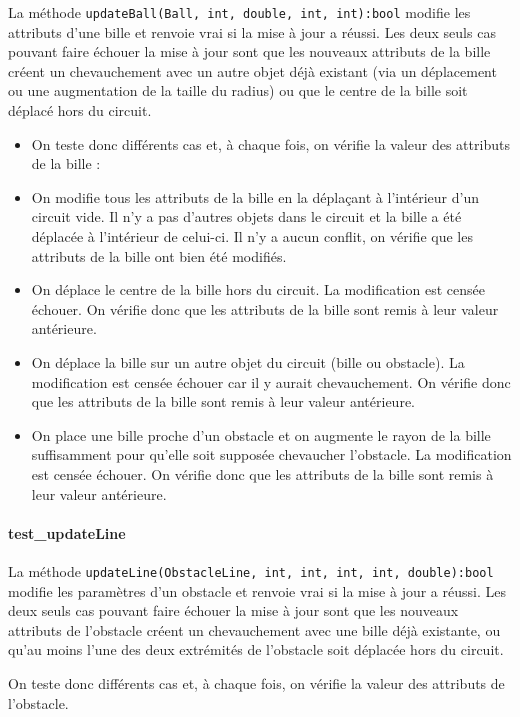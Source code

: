 \documentclass{report}
\begin{document}
La méthode \texttt{updateBall(Ball, int, double, int, int):bool} modifie les attributs d’une bille et renvoie vrai si la mise à jour a réussi.
Les deux seuls cas pouvant faire échouer la mise à jour sont que les nouveaux attributs de la bille créent un chevauchement avec un autre objet déjà existant (via un déplacement ou une augmentation de la taille du radius) ou que le centre de la bille soit déplacé hors du circuit.

\begin{itemize}
\item On teste donc différents cas et, à chaque fois, on vérifie la valeur des attributs de la bille :
\item On modifie tous les attributs de la bille en la déplaçant à l’intérieur d’un circuit vide. Il n’y a pas d’autres objets dans le circuit et la bille a été déplacée à l’intérieur de celui-ci. Il n’y a aucun conflit, on vérifie que les attributs de la bille ont bien été modifiés.
\item On déplace le centre de la bille hors du circuit. La modification est censée échouer. On vérifie donc que les attributs de la bille sont remis à leur valeur antérieure.
\item On déplace la bille sur un autre objet du circuit (bille ou obstacle). La modification est censée échouer car il y aurait chevauchement. On vérifie donc que les attributs de la bille sont remis à leur valeur antérieure.
\item On place une bille proche d’un obstacle et on augmente le rayon de la bille suffisamment pour qu’elle soit supposée chevaucher l’obstacle. La modification est censée échouer. On vérifie donc que les attributs de la bille sont remis à leur valeur antérieure.
\end{itemize}

\paragraph{test\_updateLine}

La méthode \texttt{updateLine(ObstacleLine, int, int, int, int, double):bool} modifie les paramètres d’un obstacle et renvoie vrai si la mise à jour a réussi.
Les deux seuls cas pouvant faire échouer la mise à jour sont que les nouveaux attributs de l’obstacle créent un chevauchement avec une bille déjà existante, ou qu’au moins l’une des deux extrémités de l’obstacle soit déplacée hors du circuit.

On teste donc différents cas et, à chaque fois, on vérifie la valeur des attributs de l’obstacle.
\end{document}
